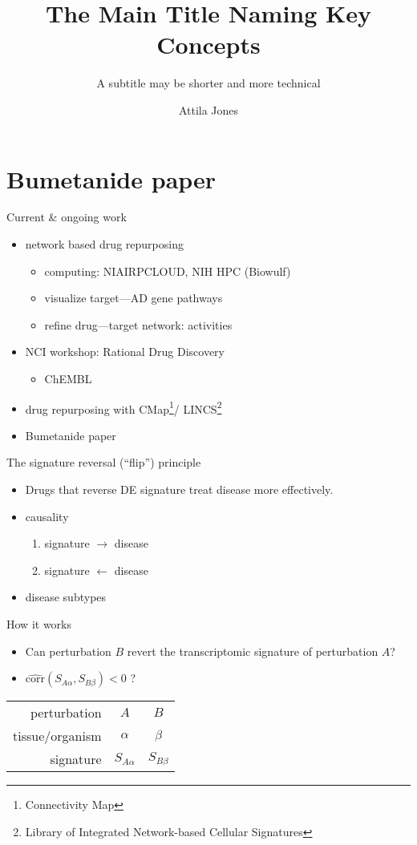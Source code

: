 \documentclass[aspectratio=169]{beamer}
\title{The Main Title Naming Key Concepts}
\subtitle{A subtitle may be shorter and more technical}
\author{Attila Jones}
\date{}
\begin{document}
\section{Bumetanide paper}

\begin{frame}{Current \& ongoing work}
\begin{itemize}
\item network based drug repurposing
\begin{itemize}
\item computing: NIAIRPCLOUD, NIH HPC (Biowulf)
\item visualize target---AD gene pathways
\item refine drug---target network: activities
\end{itemize}
\item NCI workshop: Rational Drug Discovery
\begin{itemize}
\item ChEMBL
\end{itemize}
\item drug repurposing with CMap\footnote{Connectivity Map}/
  LINCS\footnote{Library of Integrated Network-based Cellular Signatures}
\item Bumetanide paper
\end{itemize}
\end{frame}

\begin{frame}{The signature reversal (``flip'') principle}
\begin{itemize}
\item \alert{Drugs that reverse DE signature treat disease	more effectively.}
\item causality
\begin{enumerate}
	\item signature $\rightarrow$ disease
	\item signature $\leftarrow$ disease
\end{enumerate}
\item disease subtypes
\end{itemize}
\end{frame}

\begin{frame}{How it works}
\begin{itemize}
  \item Can perturbation $B$ revert the transcriptomic signature of perturbation $A$?
  \item $\widehat{\mathrm{corr}}(S_{A\alpha}, S_{B\beta}) < 0$ ?
\end{itemize}
\vfill
\begin{tabular}{r|cc|}
  \hline
  perturbation & $A$ & $B$ \\
  tissue/organism & $\alpha$ & $\beta$ \\
  signature & $S_{A\alpha}$ & $S_{B\beta}$ \\
  \hline
\end{tabular}
\end{frame}
\end{document}

